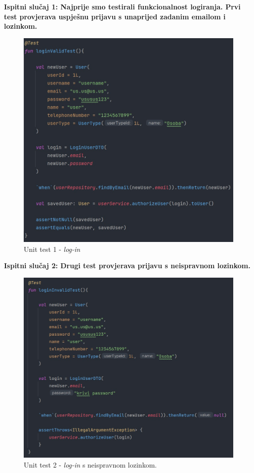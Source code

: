 \pagebreak

\textbf{Ispitni slučaj 1: Najprije smo testirali funkcionalnost logiranja. Prvi test provjerava uspješnu prijavu s unaprijed zadanim emailom i lozinkom.}

		\begin{figure}[H]
			\includegraphics[scale=0.5]{slike/unit1.PNG} 
			\centering
			\caption{Unit test 1 - \textit{log-in}}
			\label{unit1}
		\end{figure}

\pagebreak
\textbf{Ispitni slučaj 2: Drugi test provjerava prijavu s neispravnom lozinkom.}

		\begin{figure}[H]
			\includegraphics[scale=0.5]{slike/unit2.PNG} 
			\centering
			\caption{Unit test 2 - \textit{log-in} s neispravnom lozinkom.}
			\label{unit2}
		\end{figure}


